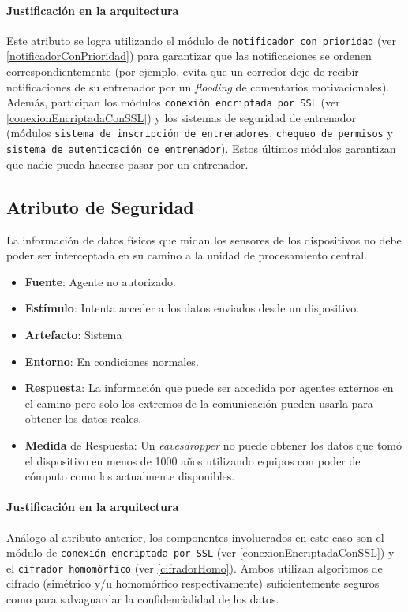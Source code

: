 \paragraph{Justificación en la arquitectura}
Este atributo se logra utilizando el módulo de \texttt{notificador con prioridad} (ver \ref{notificadorConPrioridad}) para garantizar que las notificaciones se ordenen correspondientemente (por ejemplo, evita que un corredor deje de recibir notificaciones de su entrenador por un \emph{flooding} de comentarios motivacionales). Además, participan los módulos \texttt{conexión encriptada por SSL} (ver \ref{conexionEncriptadaConSSL}) y los sistemas de seguridad de entrenador (módulos \texttt{sistema de inscripción de entrenadores}, \texttt{chequeo de permisos} y \texttt{sistema de autenticación de entrenador}). Estos últimos módulos garantizan que nadie pueda hacerse pasar por un entrenador.


\subsection{Atributo de Seguridad}
La información de datos físicos que midan los sensores de los dispositivos no debe poder ser interceptada en su camino a la unidad de procesamiento central.

\begin{itemize}
  \item \textbf{Fuente}: Agente no autorizado.
  \item \textbf{Estímulo}: Intenta acceder a los datos enviados desde un dispositivo.
  \item \textbf{Artefacto}: Sistema
  \item \textbf{Entorno}: En condiciones normales.
  \item \textbf{Respuesta}: La información que puede ser accedida por agentes externos en el camino pero solo los extremos de la comunicación pueden usarla para obtener los datos reales.
  \item \textbf{Medida} de Respuesta: Un \emph{eavesdropper} no puede obtener los datos que tomó el dispositivo en menos de 1000 años utilizando equipos con poder de cómputo como los actualmente disponibles.
\end{itemize}

\paragraph{Justificación en la arquitectura}
Análogo al atributo anterior, los componentes involucrados en este caso son el módulo de \texttt{conexión encriptada por SSL} (ver \ref{conexionEncriptadaConSSL}) y el \texttt{cifrador homomórfico} (ver \ref{cifradorHomo}). Ambos utilizan algoritmos de cifrado (simétrico y/u homomórfico respectivamente) suficientemente seguros como para salvaguardar la confidencialidad de los datos.

